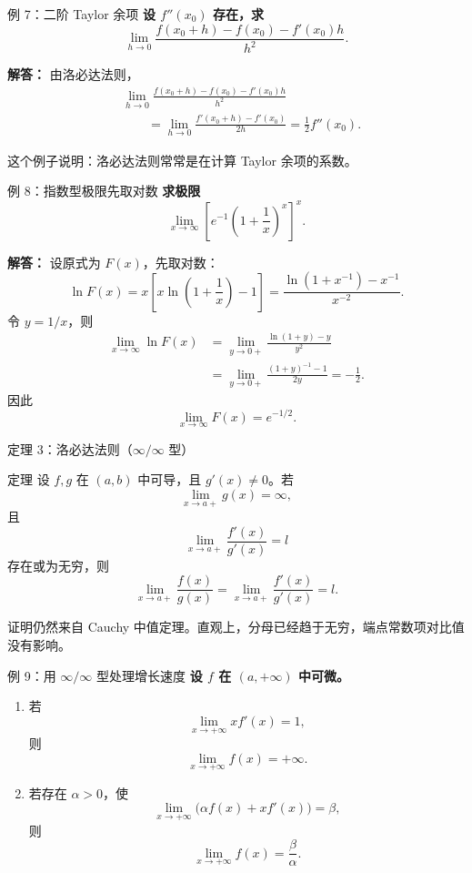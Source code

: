 \documentclass[aspectratio=169,11pt]{ctexbeamer}
\begin{document}
\begin{frame}{例 7：二阶 Taylor 余项}
\small
\textbf{设 $f''(x_0)$ 存在，求}
\[
  \lim_{h\to0}
  \frac{f(x_0+h)-f(x_0)-f'(x_0)h}{h^2}.
\]

\textbf{解答：}
由洛必达法则，
\[
\begin{aligned}
&\lim_{h\to0}
\frac{f(x_0+h)-f(x_0)-f'(x_0)h}{h^2}\\
&\qquad =
\lim_{h\to0}
\frac{f'(x_0+h)-f'(x_0)}{2h}
=\frac12 f''(x_0).
\end{aligned}
\]

这个例子说明：洛必达法则常常是在计算 Taylor 余项的系数。
\end{frame}

\begin{frame}{例 8：指数型极限先取对数}
\small
\textbf{求极限}
\[
  \lim_{x\to\infty}\left[e^{-1}\left(1+\frac1x\right)^x\right]^x.
\]

\textbf{解答：}
设原式为 $F(x)$，先取对数：
\[
  \ln F(x)
  =x\left[x\ln\left(1+\frac1x\right)-1\right]
  =
  \frac{\ln(1+x^{-1})-x^{-1}}{x^{-2}}.
\]
令 $y=1/x$，则
\[
\begin{aligned}
\lim_{x\to\infty}\ln F(x)
&=\lim_{y\to0+}\frac{\ln(1+y)-y}{y^2}\\
&=\lim_{y\to0+}\frac{(1+y)^{-1}-1}{2y}
=-\frac12.
\end{aligned}
\]
因此
\[
  \lim_{x\to\infty}F(x)=e^{-1/2}.
\]
\end{frame}

\begin{frame}{定理 3：洛必达法则（$\infty/\infty$ 型）}
\small
\begin{block}{定理}
设 $f,g$ 在 $(a,b)$ 中可导，且 $g'(x)\ne0$。若
\[
  \lim_{x\to a+}g(x)=\infty,
\]
且
\[
  \lim_{x\to a+}\frac{f'(x)}{g'(x)}=l
\]
存在或为无穷，则
\[
  \lim_{x\to a+}\frac{f(x)}{g(x)}
  =
  \lim_{x\to a+}\frac{f'(x)}{g'(x)}
  =l.
\]
\end{block}

证明仍然来自 Cauchy 中值定理。直观上，分母已经趋于无穷，端点常数项对比值没有影响。
\end{frame}

\begin{frame}{例 9：用 $\infty/\infty$ 型处理增长速度}
\small
\textbf{设 $f$ 在 $(a,+\infty)$ 中可微。}

\begin{enumerate}
  \item 若
  \[
    \lim_{x\to+\infty}x f'(x)=1,
  \]
  则
  \[
    \lim_{x\to+\infty}f(x)=+\infty.
  \]
  \item 若存在 $\alpha>0$，使
  \[
    \lim_{x\to+\infty}\bigl(\alpha f(x)+x f'(x)\bigr)=\beta,
  \]
  则
  \[
    \lim_{x\to+\infty}f(x)=\frac{\beta}{\alpha}.
  \]
\end{enumerate}
\end{frame}
\end{document}
